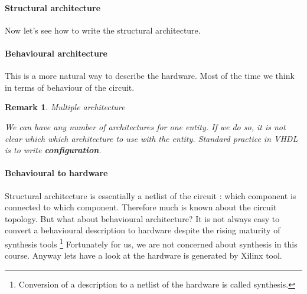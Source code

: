 \documentclass[a4paper,10pt]{article}
\newtheorem{remark}{Remark}
\begin{document}
\paragraph{Structural architecture}
  Now let's see how to write the structural architecture.

  

  \paragraph{Behavioural architecture}

  This is a more natural way to describe the hardware. Most of the time we think
  in terms of behaviour of the circuit. 
 
  


  \begin{remark}{Multiple architecture}
    
    We can have any number of architectures for one entity. If we do so, it is
    not clear which which architecture to use with the entity. Standard practice
    in VHDL is to write \textbf{configuration}.
 
  \end{remark}

  \paragraph{Behavioural to hardware}
    
  Structural architecture is essentially a netlist of the circuit : which
  component is connected to which component. Therefore much is known about the
  circuit topology. But what about behavioural architecture? It is not always
  easy to convert a behavioural description to hardware despite the rising
  maturity of synthesis tools \footnote{Conversion of a description to a netlist
  of the hardware is called synthesis.} Fortunately for us, we are not concerned
  about synthesis in this course.  Anyway lets have a look at the hardware is
  generated by Xilinx tool.
\end{document}
